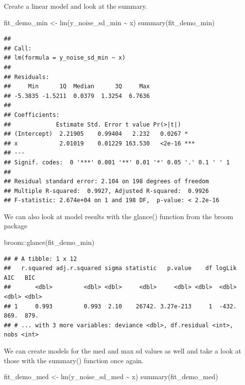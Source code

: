 \documentclass[
]{book}
\newenvironment{Shaded}{\begin{snugshade}}{\end{snugshade}}
\newcommand{\FunctionTok}[1]{\textcolor[rgb]{0.00,0.00,0.00}{#1}}
\newcommand{\NormalTok}[1]{#1}
\newcommand{\OtherTok}[1]{\textcolor[rgb]{0.56,0.35,0.01}{#1}}
\newcommand{\SpecialCharTok}[1]{\textcolor[rgb]{0.00,0.00,0.00}{#1}}
\begin{document}
Create a linear model and look at the summary.

\begin{Shaded}
\begin{Highlighting}[]
\NormalTok{fit\_demo\_min }\OtherTok{\textless{}{-}} \FunctionTok{lm}\NormalTok{(y\_noise\_sd\_min }\SpecialCharTok{\textasciitilde{}}\NormalTok{ x)}
\FunctionTok{summary}\NormalTok{(fit\_demo\_min)}
\end{Highlighting}
\end{Shaded}

\begin{verbatim}
## 
## Call:
## lm(formula = y_noise_sd_min ~ x)
## 
## Residuals:
##     Min      1Q  Median      3Q     Max 
## -5.3835 -1.5211  0.0379  1.3254  6.7636 
## 
## Coefficients:
##             Estimate Std. Error t value Pr(>|t|)    
## (Intercept)  2.21905    0.99404   2.232   0.0267 *  
## x            2.01019    0.01229 163.530   <2e-16 ***
## ---
## Signif. codes:  0 '***' 0.001 '**' 0.01 '*' 0.05 '.' 0.1 ' ' 1
## 
## Residual standard error: 2.104 on 198 degrees of freedom
## Multiple R-squared:  0.9927, Adjusted R-squared:  0.9926 
## F-statistic: 2.674e+04 on 1 and 198 DF,  p-value: < 2.2e-16
\end{verbatim}

We can also look at model results with the glance() function from the broom package

\begin{Shaded}
\begin{Highlighting}[]
\NormalTok{broom}\SpecialCharTok{::}\FunctionTok{glance}\NormalTok{(fit\_demo\_min)}
\end{Highlighting}
\end{Shaded}

\begin{verbatim}
## # A tibble: 1 x 12
##   r.squared adj.r.squared sigma statistic   p.value    df logLik   AIC   BIC
##       <dbl>         <dbl> <dbl>     <dbl>     <dbl> <dbl>  <dbl> <dbl> <dbl>
## 1     0.993         0.993  2.10    26742. 3.27e-213     1  -432.  869.  879.
## # ... with 3 more variables: deviance <dbl>, df.residual <int>, nobs <int>
\end{verbatim}

We can create models for the med and max sd values as well and take a look at those with the summary() function once again.

\begin{Shaded}
\begin{Highlighting}[]
\NormalTok{fit\_demo\_med }\OtherTok{\textless{}{-}} \FunctionTok{lm}\NormalTok{(y\_noise\_sd\_med }\SpecialCharTok{\textasciitilde{}}\NormalTok{ x)}
\FunctionTok{summary}\NormalTok{(fit\_demo\_med)}
\end{Highlighting}
\end{Shaded}
\end{document}

